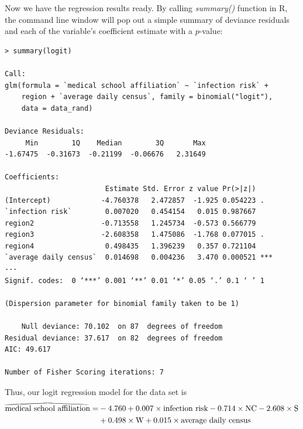 \documentclass[11pt]{article}
\newcommand\reallywidehat[1]{%
\savestack{\tmpbox}{\stretchto{%
  \scaleto{%
    \scalerel*[\widthof{\ensuremath{#1}}]{\kern-.6pt\bigwedge\kern-.6pt}%
    {\rule[-\textheight/2]{1ex}{\textheight}}%
  }{\textheight}%
}{0.5ex}}%
\stackon[1pt]{#1}{\tmpbox}%
}
\begin{document}
Now we have the regression results ready. By calling \textit{summary()} function in R, the command line window will pop out a simple summary of deviance residuals and each of the variable's coefficient estimate with a $p$-value:

\begin{commandline}
\begin{verbatim}
> summary(logit)

Call:
glm(formula = `medical school affiliation` ~ `infection risk` + 
    region + `average daily census`, family = binomial("logit"), 
    data = data_rand)

Deviance Residuals: 
     Min        1Q    Median        3Q       Max  
-1.67475  -0.31673  -0.21199  -0.06676   2.31649  

Coefficients:
                        Estimate Std. Error z value Pr(>|z|)    
(Intercept)            -4.760378   2.472857  -1.925 0.054223 .  
`infection risk`        0.007020   0.454154   0.015 0.987667    
region2                -0.713558   1.245734  -0.573 0.566779    
region3                -2.608358   1.475086  -1.768 0.077015 .  
region4                 0.498435   1.396239   0.357 0.721104    
`average daily census`  0.014698   0.004236   3.470 0.000521 ***
---
Signif. codes:  0 ‘***’ 0.001 ‘**’ 0.01 ‘*’ 0.05 ‘.’ 0.1 ‘ ’ 1

(Dispersion parameter for binomial family taken to be 1)

    Null deviance: 70.102  on 87  degrees of freedom
Residual deviance: 37.617  on 82  degrees of freedom
AIC: 49.617

Number of Fisher Scoring iterations: 7

\end{verbatim}
\end{commandline}

Thus, our logit regression model for the data set is
\begin{equation}
\begin{split}
\reallywidehat{\textrm{medical school affiliation}}=&-4.760+0.007\times\textrm{infection risk}-0.714\times\textrm{NC}-2.608\times\textrm{S}\\
&+0.498\times\textrm{W}+0.015\times\textrm{average daily census}
\end{split}
\end{equation}
\end{document}
